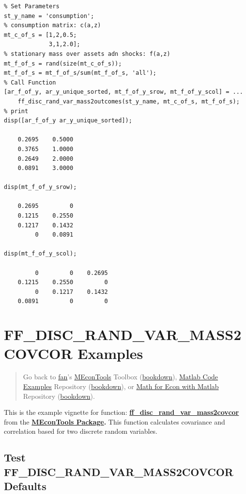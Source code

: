 \documentclass[
]{book}
\begin{document}
\begin{verbatim}
% Set Parameters
st_y_name = 'consumption';
% consumption matrix: c(a,z)
mt_c_of_s = [1,2,0.5;
             3,1,2.0];
% stationary mass over assets adn shocks: f(a,z)
mt_f_of_s = rand(size(mt_c_of_s));
mt_f_of_s = mt_f_of_s/sum(mt_f_of_s, 'all');
% Call Function
[ar_f_of_y, ar_y_unique_sorted, mt_f_of_y_srow, mt_f_of_y_scol] = ...
    ff_disc_rand_var_mass2outcomes(st_y_name, mt_c_of_s, mt_f_of_s);
% print
disp([ar_f_of_y ar_y_unique_sorted]);

    0.2695    0.5000
    0.3765    1.0000
    0.2649    2.0000
    0.0891    3.0000

disp(mt_f_of_y_srow);

    0.2695         0
    0.1215    0.2550
    0.1217    0.1432
         0    0.0891

disp(mt_f_of_y_scol);

         0         0    0.2695
    0.1215    0.2550         0
         0    0.1217    0.1432
    0.0891         0         0
\end{verbatim}

\hypertarget{ff_disc_rand_var_mass2covcor-examples}{%
\section{FF\_DISC\_RAND\_VAR\_MASS2COVCOR Examples}\label{ff_disc_rand_var_mass2covcor-examples}}

\begin{quote}
Go back to \href{http://fanwangecon.github.io/}{fan}'s \href{https://fanwangecon.github.io/MEconTools/}{MEconTools} Toolbox (\href{https://fanwangecon.github.io/MEconTools/bookdown}{bookdown}), \href{https://fanwangecon.github.io/M4Econ/}{Matlab Code Examples} Repository (\href{https://fanwangecon.github.io/M4Econ/bookdown}{bookdown}), or \href{https://fanwangecon.github.io/Math4Econ/}{Math for Econ with Matlab} Repository (\href{https://fanwangecon.github.io/Math4Econ/bookdown}{bookdown}).
\end{quote}

This is the example vignette for function:
\href{https://github.com/FanWangEcon/MEconTools/blob/master/MEconTools/stats/ff_disc_rand_var_mass2covcor.m}{\textbf{ff\_disc\_rand\_var\_mass2covcor}}
from the \href{https://fanwangecon.github.io/MEconTools/}{\textbf{MEconTools
Package}}\textbf{.} This function
calculates covariance and correlation based for two discrete random
variables.

\hypertarget{test-ff_disc_rand_var_mass2covcor-defaults}{%
\subsection{Test FF\_DISC\_RAND\_VAR\_MASS2COVCOR Defaults}\label{test-ff_disc_rand_var_mass2covcor-defaults}}
\end{document}
